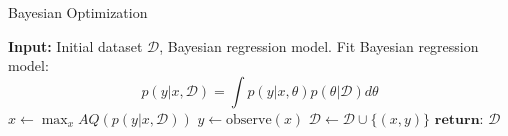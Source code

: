 \begin{algorithm}[H]
    \caption{Bayesian Optimization}
    \begin{algorithmic}
    \State \textbf{Input:} Initial dataset $\mathcal{D}$, Bayesian regression model.
        \State Fit Bayesian regression model: $$p(y|x,\mathcal{D}) = \int p(y|x,\theta)p(\theta|\mathcal{D})d\theta$$
        \State $x \gets \max_x AQ(p(y|x,\mathcal{D}))$
        \State $y \gets \text{observe}(x)$ 
        \State $\mathcal{D} \gets \mathcal{D} \cup \{(x,y)\} $ 
    \EndWhile
    \State $\textbf{return: } \mathcal{D}$
    \end{algorithmic}
\end{algorithm}



